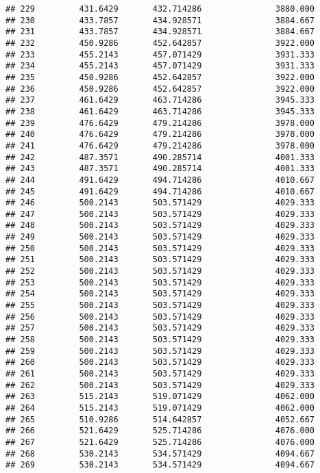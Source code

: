 \documentclass[]{article}
\begin{document}
\begin{verbatim}
## 229         431.6429       432.714286               3880.000
## 230         433.7857       434.928571               3884.667
## 231         433.7857       434.928571               3884.667
## 232         450.9286       452.642857               3922.000
## 233         455.2143       457.071429               3931.333
## 234         455.2143       457.071429               3931.333
## 235         450.9286       452.642857               3922.000
## 236         450.9286       452.642857               3922.000
## 237         461.6429       463.714286               3945.333
## 238         461.6429       463.714286               3945.333
## 239         476.6429       479.214286               3978.000
## 240         476.6429       479.214286               3978.000
## 241         476.6429       479.214286               3978.000
## 242         487.3571       490.285714               4001.333
## 243         487.3571       490.285714               4001.333
## 244         491.6429       494.714286               4010.667
## 245         491.6429       494.714286               4010.667
## 246         500.2143       503.571429               4029.333
## 247         500.2143       503.571429               4029.333
## 248         500.2143       503.571429               4029.333
## 249         500.2143       503.571429               4029.333
## 250         500.2143       503.571429               4029.333
## 251         500.2143       503.571429               4029.333
## 252         500.2143       503.571429               4029.333
## 253         500.2143       503.571429               4029.333
## 254         500.2143       503.571429               4029.333
## 255         500.2143       503.571429               4029.333
## 256         500.2143       503.571429               4029.333
## 257         500.2143       503.571429               4029.333
## 258         500.2143       503.571429               4029.333
## 259         500.2143       503.571429               4029.333
## 260         500.2143       503.571429               4029.333
## 261         500.2143       503.571429               4029.333
## 262         500.2143       503.571429               4029.333
## 263         515.2143       519.071429               4062.000
## 264         515.2143       519.071429               4062.000
## 265         510.9286       514.642857               4052.667
## 266         521.6429       525.714286               4076.000
## 267         521.6429       525.714286               4076.000
## 268         530.2143       534.571429               4094.667
## 269         530.2143       534.571429               4094.667

\end{verbatim}
\end{document}
